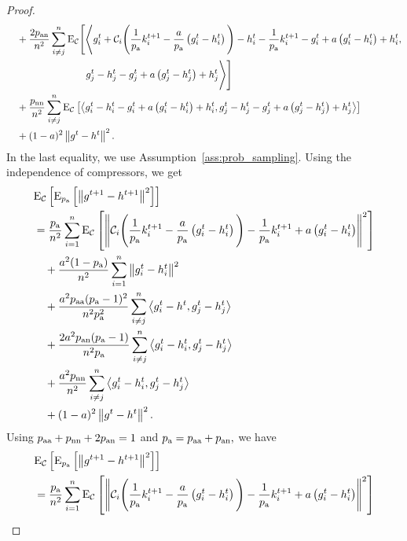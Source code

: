\documentclass{article}
\begin{document}
\begin{proof}
\begin{align*}
    &\quad +\frac{2p_{\textnormal{an}}}{n^2}\sum_{i \neq j}^n{\rm E}_{\mathcal{C}}\Bigg[\Bigg\langle g^{t}_i + \mathcal{C}_i\Bigg(\frac{1}{p_{\textnormal{a}}}k^{t+1}_i - \frac{a}{p_{\textnormal{a}}} \left(g^{t}_i - h^{t}_i\right)\Bigg) - h^{t}_i - \frac{1}{p_{\textnormal{a}}}k^{t+1}_i - g^{t}_i + a \left(g^{t}_i - h^{t}_i\right) + h^{t}_i,\\
    &\qquad\qquad\qquad\qquad g^{t}_j - h^{t}_j - g^{t}_j + a \left(g^{t}_j - h^{t}_j\right) + h^{t}_j\Bigg\rangle\Bigg] \\
    &\quad +\frac{p_{\textnormal{nn}}}{n^2}\sum_{i \neq j}^n{\rm E}_{\mathcal{C}}\left[\left\langle g^{t}_i - h^{t}_i - g^{t}_i + a \left(g^{t}_i - h^{t}_i\right) + h^{t}_i,g^{t}_j - h^{t}_j - g^{t}_j + a \left(g^{t}_j - h^{t}_j\right) + h^{t}_j\right\rangle\right] \\
    &\quad + (1 - a)^2\left\| g^{t} - h^{t} \right\|^2.\\
  \end{align*}
  In the last equality, we use Assumption~\ref{ass:prob_sampling}. Using the independence of compressors, we get
  \begin{align*}
    &{\rm E}_{\mathcal{C}}\left[{\rm E}_{p_{\textnormal{a}}}\left[\left\| g^{t+1} - h^{t+1} \right\|^2\right]\right] \\
    &=\frac{p_{\textnormal{a}}}{n^2}\sum_{i=1}^n{\rm E}_{\mathcal{C}}\left[\left\| \mathcal{C}_i\Bigg(\frac{1}{p_{\textnormal{a}}}k^{t+1}_i - \frac{a}{p_{\textnormal{a}}} \left(g^{t}_i - h^{t}_i\right)\Bigg) - \frac{1}{p_{\textnormal{a}}}k^{t+1}_i + a \left(g^{t}_i - h^{t}_i\right) \right\|^2\right] \\
    &\quad+ \frac{a^2 (1 - p_{\textnormal{a}})}{n^2}\sum_{i=1}^n\left\| g^{t}_i - h^{t}_i \right\|^2 \\
    &\quad +\frac{a^2 p_{\textnormal{aa}} (p_{\textnormal{a}} - 1)^2}{n^2 p_{\textnormal{a}}^2}\sum_{i \neq j}^n\left\langle g^{t}_i - h^{t},g^{t}_j - h^{t}_j\right\rangle \\
    &\quad +\frac{2a^2p_{\textnormal{an}} (p_{\textnormal{a}} - 1)}{n^2 p_{\textnormal{a}}}\sum_{i \neq j}^n\left\langle g^{t}_i - h^{t}_i,g^{t}_j - h^{t}_j\right\rangle \\
    &\quad +\frac{a^2 p_{\textnormal{nn}}}{n^2}\sum_{i \neq j}^n\left\langle g^{t}_i - h^{t}_i,g^{t}_j - h^{t}_j\right\rangle \\
    &\quad + (1 - a)^2\left\| g^{t} - h^{t} \right\|^2.\\
  \end{align*}
  Using $p_{\textnormal{aa}} + p_{\textnormal{nn}} + 2p_{\textnormal{an}} = 1$ and $p_{\textnormal{a}} = p_{\textnormal{aa}} + p_{\textnormal{an}},$ we have
  \begin{align*}
    &\ExpSub{\cC}{\ExpSub{\probavailable}{\norm{g^{t+1} - h^{t+1}}^2}} \\
    &=\frac{\probavailable}{n^2}\sum_{i=1}^n\ExpSub{\cC}{\norm{\cC_i\Bigg(\frac{1}{\probavailable}k^{t+1}_i - \frac{a}{\probavailable} \left(g^{t}_i - h^{t}_i\right)\Bigg) - \frac{1}{\probavailable}k^{t+1}_i + a \left(g^{t}_i - h^{t}_i\right)}^2} \\

\end{align*}
\end{proof}
\end{document}
